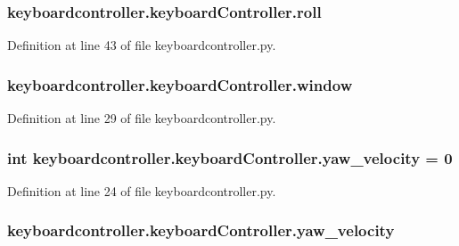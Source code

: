 \hypertarget{classkeyboardcontroller_1_1keyboardController_a4a8d6c8beae909fb2c5fb61fc2ec5b24}{
\subsubsection[{roll}]{\setlength{\rightskip}{0pt plus 5cm}keyboardcontroller.\-keyboard\-Controller.\-roll}}\label{classkeyboardcontroller_1_1keyboardController_a4a8d6c8beae909fb2c5fb61fc2ec5b24}


Definition at line 43 of file keyboardcontroller.\-py.

\hypertarget{classkeyboardcontroller_1_1keyboardController_af25e2b2c9415f5c1ea0aa8bba1a820e3}{
\subsubsection[{window}]{\setlength{\rightskip}{0pt plus 5cm}keyboardcontroller.\-keyboard\-Controller.\-window}}\label{classkeyboardcontroller_1_1keyboardController_af25e2b2c9415f5c1ea0aa8bba1a820e3}


Definition at line 29 of file keyboardcontroller.\-py.

\hypertarget{classkeyboardcontroller_1_1keyboardController_a9e36044355c782ce9ec751e4396a0981}{
\subsubsection[{yaw\-\_\-velocity}]{\setlength{\rightskip}{0pt plus 5cm}int keyboardcontroller.\-keyboard\-Controller.\-yaw\-\_\-velocity = 0\hspace{0.3cm}{\ttfamily [static]}}}\label{classkeyboardcontroller_1_1keyboardController_a9e36044355c782ce9ec751e4396a0981}


Definition at line 24 of file keyboardcontroller.\-py.

\hypertarget{classkeyboardcontroller_1_1keyboardController_ab663e9f8d311f682d374c4e401f7e34b}{
\subsubsection[{yaw\-\_\-velocity}]{\setlength{\rightskip}{0pt plus 5cm}keyboardcontroller.\-keyboard\-Controller.\-yaw\-\_\-velocity}}\label{classkeyboardcontroller_1_1keyboardController_ab663e9f8d311f682d374c4e401f7e34b}


